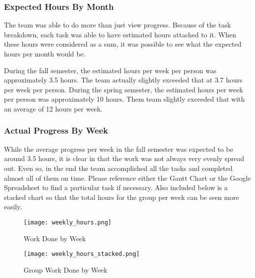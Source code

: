 \documentclass[PPFS.tex]{template/subfiles}
\begin{document}
\subsubsection{Expected Hours By Month}
The team was able to do more than just view progress. Because of the task breakdown, each task was able to have estimated hours attached to it. When these hours were considered as a sum, it was possible to see what the expected hours per month would be.

During the fall semester, the estimated hours per week per person was approximately 3.5 hours. The team actually slightly exceeded that at 3.7 hours per week per person. During the spring semester, the estimated hours per week per person was approximately 10 hours. Them team slightly exceeded that with an average of 12 hours per week.

\subsubsection{Actual Progress By Week}

While the average progress per week in the fall semester was expected to be around 3.5 hours, it is clear in  that the work was not always very evenly spread out. Even so, in the end the team accomplished all the tasks and completed almost all of them on time. Please reference either the Gantt Chart or the Google Spreadsheet to find a particular task if necessary. Also included below is a stacked chart so that the total hours for the group per week can be seen more easily.

\begin{figure}[H]
    \centering
    \texttt{[image: weekly\_hours.png]}
    \caption{Work Done by Week}
    \label{fig:groupHours}
\end{figure}

\begin{figure}[H]
    \centering
    \texttt{[image: weekly\_hours\_stacked.png]}
    \caption{Group Work Done by Week}
    \label{fig:groupHoursStacked}
\end{figure}
\end{document}
